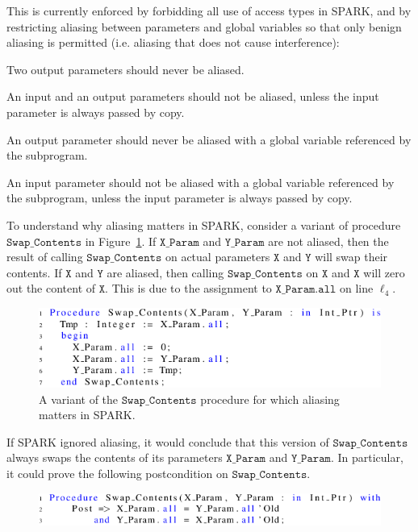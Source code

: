 \documentclass{llncs}
\newcommand\var[1]{\ensuremath{\mathtt{#1}}}
\begin{document}
This is currently enforced by forbidding all use of access types in SPARK, and by restricting aliasing between parameters and global variables so that only
benign aliasing is permitted (i.e. aliasing that does not cause interference):


\begin{compactitem}
  \item Two output parameters should never be aliased.
  \item An input and an output parameters should not be aliased, unless the input parameter is always passed by copy.
  \item An output parameter should never be aliased with a global variable referenced by the subprogram.
  \item An input parameter should not be aliased with a global variable referenced by the subprogram, unless the input parameter is always passed by copy.
\end{compactitem}

To understand why aliasing matters in SPARK, consider a variant of procedure \var{Swap\_Contents} in Figure~\ref{fig:spark_ex1}. If \var{X\_Param} and \var{Y\_Param}
are not aliased, then the result of calling \var{Swap\_Contents} on actual parameters \var{X} and \var{Y} will swap their contents. If \var{X} and \var{Y} are aliased, then calling
\var{Swap\_Contents} on \var{X} and \var{X} will zero out the content of \var{X}. This is due to the assignment to \var{X\_Param.all} on line $\ell_4$.


\begin{figure}[htb!]
\centering
  \captionsetup{justification=centering,margin=0.6cm}
   \includegraphics[]{spark_ex1}
   \caption{A variant of the \var{Swap\_Contents} procedure for which aliasing matters in SPARK.}
   \label{fig:spark_ex1}
\end{figure}

If SPARK ignored aliasing, it would conclude that this version of \var{Swap\_Contents} always swaps the contents of its parameters \var{X\_Param} and \var{Y\_Param}.
In particular, it could prove the following postcondition on \var{Swap\_Contents}.

\begin{figure}[htb!]
\centering
  \captionsetup{justification=centering,margin=0.6cm}
   \includegraphics[]{spark_ex1_proof}
   \label{fig:spark_ex1_proof}
\end{figure}
\end{document}
